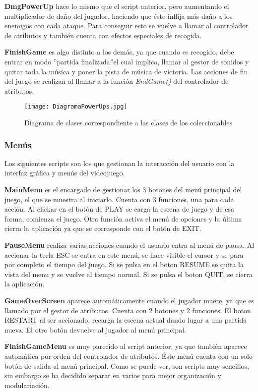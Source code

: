 \textbf{DmgPowerUp} hace lo mismo que el script anterior, pero aumentando el multiplicador de daño del jugador, haciendo que éste inflija más daño a los enemigos con cada ataque. Para conseguir esto se vuelve a llamar al controlador de atributos y también cuenta con efectos especiales de recogida.

\textbf{FinishGame} es algo distinto a los demás, ya que cuando es recogido, debe entrar en modo ''partida finalizada''el cual implica, llamar al gestor de sonidos y quitar toda la música y poner la pista de música de victoria. Las acciones de fin del juego se realizan al llamar a la función \textit{EndGame()} del controlador de atributos. 

\begin{figure}[H]
    \centering
    \texttt{[image: DiagramaPowerUps.jpg]}
    \caption{Diagrama de clases correspondiente a las clases de los coleccionables}
\end{figure}

\subsubsection{Menús}

Los siguientes scripts son los que gestionan la interacción del usuario con la interfaz gráfica y menús del videojuego.

\textbf{MainMenu} es el encargado de gestionar los 3 botones del menú principal del juego, el que se muestra al iniciarlo. Cuenta con 3 funciones, una para cada acción. Al clickar en el botón de PLAY se carga la escena de juego y de esa forma, comienza el juego. Otra función activa el menú de opciones y la última cierra la aplicación ya que se corresponde con el botón de EXIT.

\textbf{PauseMenu} realiza varias acciones cuando el usuario entra al menú de pausa. Al accionar la tecla ESC se entra en este menú, se hace visible el cursor y se para por completo el tiempo del juego. Si se pulsa en el boton RESUME se quita la vista del menu y se vuelve al tiempo normal. Si se pulsa el boton QUIT, se cierra la aplicación.

\textbf{GameOverScreen} aparece automáticamente cuando el jugador muere, ya que es llamado por el gestor de atributos. Cuenta con 2 botones y 2 funciones. El boton RESTART al ser accionado, recarga la escena actual dando lugar a una partida nueva. El otro botón devuelve al jugador al menú principal. 

\textbf{FinishGameMenu} es muy parecido al script anterior, ya que también aparece automática por orden del controlador de atributos. Éste menú cuenta con un solo botón de salida al menú principal. Como se puede ver, son scripts muy sencillos, sin embargo se ha decidido separar en varios para mejor organización y modulariación.

